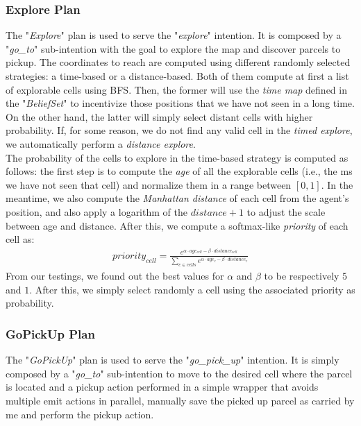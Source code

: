         \subsubsection{Explore Plan}
            The "\textit{Explore}" plan is used to serve the "\textit{explore}" intention. It is composed by a "\textit{go\_to}" sub-intention with the goal to explore the map and discover parcels to pickup. The coordinates to reach are computed using different randomly selected strategies: a time-based or a distance-based. Both of them compute at first a list of explorable cells using BFS. Then, the former will use the \textit{time map} defined in the "\textit{BeliefSet}" to incentivize those positions that we have not seen in a long time. On the other hand, the latter will simply select distant cells with higher probability. If, for some reason, we do not find any valid cell in the \textit{timed explore}, we automatically perform a \textit{distance explore}.
            \medskip\\
            The probability of the cells to explore in the time-based strategy is computed as follows: the first step is to compute the \textit{age} of all the explorable cells (i.e., the ms we have not seen that cell) and normalize them in a range between $[0, 1]$. In the meantime, we also compute the \textit{Manhattan distance} of each cell from the agent's position, and also apply a logarithm of the $distance + 1$ to adjust the scale between age and distance. After this, we compute a softmax-like \textit{priority} of each cell as:
            \begin{gather*}
                priority_{cell} = \frac{e^{\alpha \cdot age_{cell} - \beta \cdot distance_{cell}}}{\sum_{c \in cells}e^{\alpha \cdot age_c - \beta \cdot distance_c}}
            \end{gather*}
            From our testings, we found out the best values for $\alpha$ and $\beta$ to be respectively $5$ and $1$. After this, we simply select randomly a cell using the associated priority as probability.

        \subsubsection{GoPickUp Plan}
            The "\textit{GoPickUp}" plan is used to serve the "\textit{go\_pick\_up}" intention. It is simply composed by a "\textit{go\_to}" sub-intention to move to the desired cell where the parcel is located and a pickup action performed in a simple wrapper that avoids multiple emit actions in parallel, manually save the picked up parcel as carried by me and perform the pickup action. 

